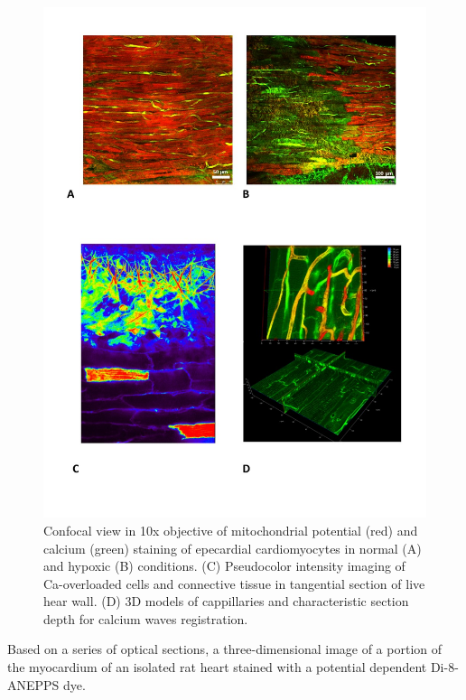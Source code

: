 \documentclass{biophys-new}
\begin{document}
\begin{figure}[hbt!]
\centering
\includegraphics[width=0.8\linewidth]{fig1.jpg}
\caption{Confocal view in 10x objective of mitochondrial potential (red) and calcium (green) staining of epecardial cardiomyocytes in normal (A) and hypoxic (B) conditions. (C) Pseudocolor intensity imaging of Ca-overloaded cells and connective tissue in  tangential section of live hear wall. (D) 3D models of  cappillaries and characteristic section depth for calcium waves registration.}
\label{fig:fig1}
\end{figure}


Based on a series of optical sections, a three-dimensional image of a portion of the myocardium of an isolated rat heart stained with a potential dependent Di-8-ANEPPS dye.
\end{document}
